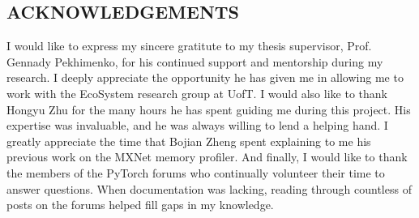 \documentclass[12pt,letterpaper]{article}
\begin{document}
\vspace*{\fill}
\begin{singlespace}
\begin{center}
\section*{ACKNOWLEDGEMENTS}
\end{center}
I would like to express my sincere gratitute to my thesis supervisor, Prof. Gennady Pekhimenko, for his continued support and mentorship during my research. I deeply appreciate the opportunity he has given me in allowing me to work with the EcoSystem research group at UofT. I would also like to thank Hongyu Zhu for the many hours he has spent guiding me during this project. His expertise was invaluable, and he was always willing to lend a helping hand. I greatly appreciate the time that Bojian Zheng spent explaining to me his previous work on the MXNet memory profiler. And finally, I would like to thank the members of the PyTorch forums who continually volunteer their time to answer questions. When documentation was lacking, reading through countless of posts on the forums helped fill gaps in my knowledge.
\end{singlespace}
\vspace*{\fill}
\newpage 
\tableofcontents
\newpage

\listoffigures
\newpage 
\listoftables
\newpage 
\lstlistoflistings 
\newpage 




\end{document}

